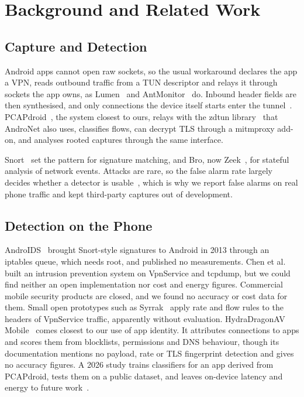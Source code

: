 \documentclass[runningheads]{llncs}
\begin{document}
\section{Background and Related Work}\label{sec:related}

\subsection{Capture and Detection}

Android apps cannot open raw sockets, so the usual workaround declares the app a VPN, reads outbound traffic from a TUN descriptor and relays it through sockets the app owns, as Lumen~\cite{razaghpanah} and AntMonitor~\cite{antmonitor} do. Inbound header fields are then synthesised, and only connections the device itself starts enter the tunnel~\cite{pcapdroiddocs}. PCAPdroid~\cite{pcapdroid}, the system closest to ours, relays with the zdtun library~\cite{zdtun} that AndroNet also uses, classifies flows, can decrypt TLS through a mitmproxy add-on, and analyses rooted captures through the same interface.

Snort~\cite{snort} set the pattern for signature matching, and Bro, now Zeek~\cite{bro}, for stateful analysis of network events. Attacks are rare, so the false alarm rate largely decides whether a detector is usable~\cite{baserate}, which is why we report false alarms on real phone traffic and kept third-party captures out of development.

\subsection{Detection on the Phone}

AndroIDS~\cite{androids} brought Snort-style signatures to Android in 2013 through an iptables queue, which needs root, and published no measurements. Chen et al.~\cite{chen2021} built an intrusion prevention system on VpnService and tcpdump, but we could find neither an open implementation nor cost and energy figures. Commercial mobile security products are closed, and we found no accuracy or cost data for them. Small open prototypes such as Syrrak~\cite{syrrak} apply rate and flow rules to the headers of VpnService traffic, apparently without evaluation. HydraDragonAV Mobile~\cite{hydradragon} comes closest to our use of app identity. It attributes connections to apps and scores them from blocklists, permissions and DNS behaviour, though its documentation mentions no payload, rate or TLS fingerprint detection and gives no accuracy figures. A 2026 study trains classifiers for an app derived from PCAPdroid, tests them on a public dataset, and leaves on-device latency and energy to future work~\cite{khalemskii}.
\end{document}
